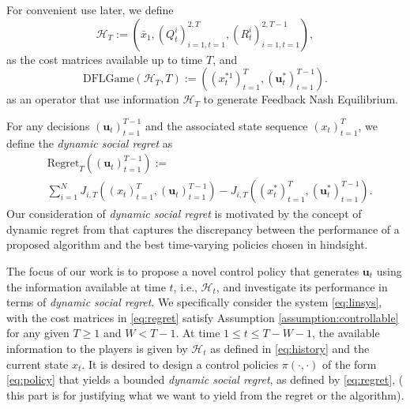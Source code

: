 \documentclass[letterpaper, 10 pt, conference]{ieeeconf}  %
\begin{document}
For convenient use later, we define 
\begin{equation}\label{eq:history}
    \mathcal{H}_{T} := ( \bar{x}_{1},(Q_{t}^{i})_{i=1,t=1}^{2,T},(R_{t}^{i})_{i=1,t=1}^{2,T-1}),
\end{equation}
as the cost matrices available up to time $T$, and
\begin{equation}\label{eq:regret}
 \text{DFLGame}(\mathcal{H}_{T},T):=((x_{t}^{*1})_{t=1}^{T}, (\mathbf{u}_{t}^{*})_{t=1}^{T-1}).
\end{equation}
as an operator that use information $\mathcal{H}_{T}$ to generate Feedback Nash Equilibrium.

For any decisions $(\mathbf{u}_{t})_{t=1}^{T-1}$ and the associated state sequence $(x_{t})_{t=1}^{T}$, we define the \emph{dynamic social regret} as
\begin{equation}
    \begin{split}
        &\text{Regret}_{T}((\mathbf{u}_{t})_{t=1}^{T-1}) := \\
        &\sum_{i=1}^{N} J_{i,T}((x_{t})_{t=1}^{T},(\mathbf{u}_{t})_{t=1}^{T-1}) - J_{i,T}((x_{t}^{*})_{t=1}^{T},(\mathbf{u}_{t}^{*})_{t=1}^{T-1}).
    \end{split}
\end{equation}
Our consideration of \emph{dynamic social regret} is motivated by the concept of dynamic regret from \cite[Equation (5)]{chen_regret_2022} that captures the discrepancy between the performance of a proposed algorithm and the best time-varying policies chosen in hindsight.

The focus of our work is to propose a novel control policy that generates $\mathbf{u}_{t}$ using the information available at time $t$, i.e., $\mathcal{H}_{t}$, and investigate its performance in terms of \emph{dynamic social regret}. We specifically consider the system \eqref{eq:linsys}, with the cost matrices in \eqref{eq:regret} satisfy Assumption \ref{assumption:controllable} for any given $T \geq 1$ and $W < T-1$. At time $1 \leq t \leq T-W-1$, the available information to the players is given by $\mathcal{H}_{t}$ as defined in \eqref{eq:history} and the current state $x_{t}$. It is desired to design a control policies $\pi(\cdot, \cdot)$ of the form \eqref{eq:policy} that yields a bounded \emph{dynamic social regret}, as defined by \eqref{eq:regret}, (\color{red} this part is for justifying what we want to yield from the regret or the algorithm\color{black}).



\end{document}
